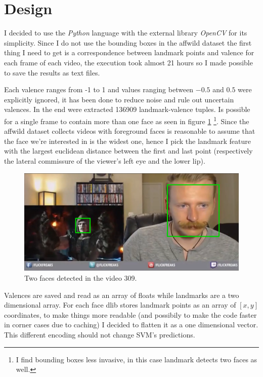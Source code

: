 \section{Design}
I decided to use the \textit{Python} language with the external library \textit{OpenCV} for its simplicity.
Since I do not use the bounding boxes in the affwild dataset the first thing I need to get is a correspondence between landmark points and valence for each frame of each video, the execution took almost 21 hours so I made possible to save the results as text files.

Each valence ranges from -1 to 1 and values ranging between $-0.5$  and $0.5$ were explicitly ignored, it has been done to reduce noise and rule out uncertain valences.
In the end were extracted 136909 landmark-valence tuples.
Is possible for a single frame to contain more than one face as seen in figure \ref{fig:double_face} \footnote{I find bounding boxes less invasive, in this case landmark detects two faces as well.}.
Since the affwild dataset collects videos with foreground faces is reasonable to assume that the face we're interested in is the widest one, hence I pick the landmark feature with the largest euclidean distance between the first and last point (respectively the lateral commissure of the viewer's left eye and the lower lip).

\begin{figure}[h!t]
    \centering
    \includegraphics[scale=0.4]{images/309mp4_double_face.png}
    \caption{Two faces detected in the video 309.}
    \label{fig:double_face}
\end{figure}

Valences are saved and read as an array of floats while landmarks are a two dimensional array. 
For each face dlib stores landmark points as an array of $[x,y]$ coordinates, to make things more readable (and possibily to make the code faster in corner cases due to caching) I decided to flatten it as a one dimensional vector.
This different encoding should not change SVM's predictions.

